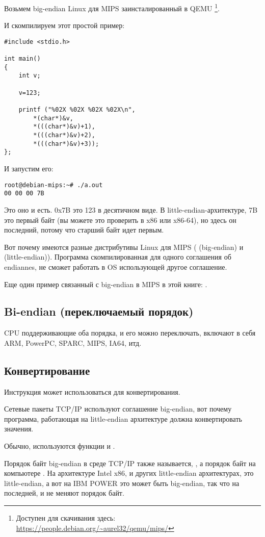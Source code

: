 Возьмем big-endian Linux для MIPS заинсталированный в QEMU
\footnote{Доступен для скачивания здесь: \url{https://people.debian.org/~aurel32/qemu/mips/}}.

И скомпилируем этот простой пример:

\begin{lstlisting}[style=customc]
#include <stdio.h>

int main()
{
	int v;

	v=123;

	printf ("%02X %02X %02X %02X\n", 
		*(char*)&v,
		*(((char*)&v)+1),
		*(((char*)&v)+2),
		*(((char*)&v)+3));
};
\end{lstlisting}

И запустим его:

\begin{lstlisting}
root@debian-mips:~# ./a.out 
00 00 00 7B
\end{lstlisting}

Это оно и есть.
0x7B это 123 в десятичном виде.
В little-endian-архитектуре, 7B это первый байт (вы можете это проверить в x86 или x86-64),
но здесь он последний, потому что старший байт идет первым.

Вот почему имеются разные дистрибутивы Linux для MIPS
( (big-endian) и  (little-endian)).
Программа скомпилированная для одного соглашения об endiannes, не сможет работать в OS использующей
другое соглашение.

Еще один пример связанный с big-endian в MIPS в этой книге: .

\subsection{Bi-endian (переключаемый порядок)}

CPU поддерживающие оба порядка, и его можно переключать, включают в себя ARM, PowerPC, SPARC, MIPS, \ac{IA64}, итд.

\subsection{Конвертирование}

Инструкция  может использоваться для конвертирования.

Сетевые пакеты TCP/IP используют соглашение big-endian, вот почему программа, работающая на little-endian архитектуре
должна конвертировать значения.

Обычно, используются функции  и .

Порядок байт big-endian в среде TCP/IP также называется, ,
а порядок байт на компьютере .
На архитектуре Intel x86, и других little-endian архитектурах,  это little-endian, 
а вот на IBM POWER это может быть big-endian, так что на последней, 
 и  не меняют порядок байт.

